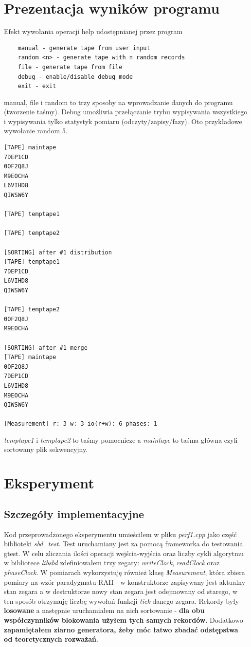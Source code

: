 \documentclass{article}
\begin{document}
\section{Prezentacja wyników programu}
Efekt wywołania operacji help udostępnianej przez program
\begin{lstlisting}
	manual - generate tape from user input
	random <n> - generate tape with n random records
	file - generate tape from file
	debug - enable/disable debug mode
	exit - exit
\end{lstlisting}
manual, file i random to trzy sposoby na wprowadzanie danych do programu (tworzenie taśmy). Debug umożliwia
przełączanie trybu wypisywania wszystkiego i wypisywania tylko statystyk pomiaru (odczyty/zapisy/fazy).  Oto 
przykładowe wywołanie random 5.
\begin{lstlisting}
[TAPE] maintape
7DEP1CD
0OF2Q8J
M9EOCHA
L6VIHD8
QIWSW6Y

[TAPE] temptape1

[TAPE] temptape2

[SORTING] after #1 distribution 
[TAPE] temptape1
7DEP1CD
L6VIHD8
QIWSW6Y

[TAPE] temptape2
0OF2Q8J
M9EOCHA

[SORTING] after #1 merge 
[TAPE] maintape
0OF2Q8J
7DEP1CD
L6VIHD8
M9EOCHA
QIWSW6Y

[Measurement] r: 3 w: 3 io(r+w): 6 phases: 1
\end{lstlisting}
\textit{temptape1} i \textit{temptape2} to taśmy pomocnicze a \textit{maintape} to taśma główna czyli sortowany plik sekwencyjny.
\section{Eksperyment}
\subsection{Szczegóły implementacyjne}
Kod przeprowadzonego eksperymentu umieściłem w pliku \textit{perf1.cpp} jako część biblioteki \textit{sbd\_test}. Test uruchamiany jest za pomocą frameworka do
testowania gtest. W celu zliczania ilości operacji wejścia-wyjścia oraz liczby cykli algorytmu w bibliotece \textit{libsbd} zdefiniowałem trzy zegary: 
\textit{writeClock}, \textit{readClock} oraz \textit{phaseClock}. W pomiarach wykorzystuję również klasę \textit{Measurement}, która zbiera pomiary na wzór paradygmatu RAII - w 
konstruktorze zapisywany jest aktualny stan zegara a w destruktorze nowy stan zegara jest odejmowany od starego, w ten sposób otrzymuję liczbę
wywołań funkcji \textit{tick} danego zegara. Rekordy były \textbf{losowane} a następnie uruchamiałem na nich
sortowanie - \textbf{dla obu współczynników blokowania użyłem tych samych rekordów}. Dodatkowo \textbf{zapamiętałem
ziarno generatora, żeby móc łatwo zbadać odstępstwa od teoretycznych rozważań}.
\end{document}

